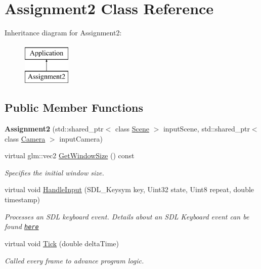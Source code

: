 \hypertarget{class_assignment2}{}\section{Assignment2 Class Reference}
\label{class_assignment2}
Inheritance diagram for Assignment2\+:\begin{figure}[H]
\begin{center}
\leavevmode
\includegraphics[height=2.000000cm]{class_assignment2}
\end{center}
\end{figure}
\subsection*{Public Member Functions}
\begin{DoxyCompactItemize}
\item 
\hypertarget{class_assignment2_ac684d2ecb894a4e71f8359e3a2ebd37f}{}{\bfseries Assignment2} (std\+::shared\+\_\+ptr$<$ class \hyperlink{class_scene}{Scene} $>$ input\+Scene, std\+::shared\+\_\+ptr$<$ class \hyperlink{class_camera}{Camera} $>$ input\+Camera)\label{class_assignment2_ac684d2ecb894a4e71f8359e3a2ebd37f}

\item 
virtual glm\+::vec2 \hyperlink{class_assignment2_ae7ae8c9e7eb64cf9661d9ddb1992f314}{Get\+Window\+Size} () const 
\begin{DoxyCompactList}\small\item\em Specifies the initial window size. \end{DoxyCompactList}\item 
virtual void \hyperlink{class_assignment2_aca261dbf5bd583ecf013dccbe2abaf90}{Handle\+Input} (S\+D\+L\+\_\+\+Keysym key, Uint32 state, Uint8 repeat, double timestamp)
\begin{DoxyCompactList}\small\item\em Processes an S\+D\+L keyboard event. Details about an S\+D\+L Keyboard event can be found \href{https://wiki.libsdl.org/SDL_KeyboardEvent}{\tt here} \end{DoxyCompactList}\item 
virtual void \hyperlink{class_assignment2_a41544ad361dd798d5fae1ec3197fc66e}{Tick} (double delta\+Time)
\begin{DoxyCompactList}\small\item\em Called every frame to advance program logic. \end{DoxyCompactList}\end{DoxyCompactItemize}
